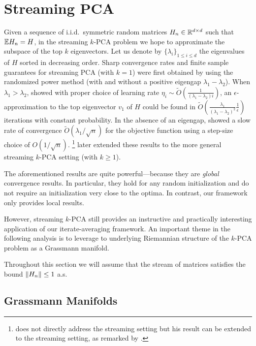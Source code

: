 \section{Streaming PCA} \label{sec:stream_pca_app}
Given a sequence of i.i.d.~symmetric random matrices $H_n \in \mathbb{R}^{d \times d}$ such that $\mathbb{E} H_n = H$, in the streaming $k$-PCA problem we hope to approximate the subspace of the top $k$ eigenvectors. Let us denote by $\{\lambda_i\}_{1\leq i\leq d}$ the eigenvalues of $H$ sorted in decreasing order. Sharp convergence rates and finite sample guarantees for streaming PCA (with $k=1$) were first obtained by \citet{jain2016streaming,shamir16b} using the randomized power method (with and without a positive eigengap $\lambda_1-\lambda_2$). When $\lambda_1>\lambda_2$,  \citet{jain2016streaming} showed
with proper choice of learning rate $\eta_i \sim  {\tilde{O}} \left( \frac{1}{(\lambda_1-\lambda_2)i} \right)$,  an $\epsilon$-approximation to the top eigenvector $v_1$ of $H$ could be found in $ {\tilde{O}}(\frac{\lambda_1}{(\lambda_1-\lambda_2)^2} \frac{1}{\epsilon})$ iterations with constant probability. In the absence of an eigengap, \citet{shamir16b} showed a slow rate of convergence $ {\tilde{O}}(\lambda_1/\sqrt{n})$ for the objective function using a step-size choice of $O(1/\sqrt{n})$. \citet{AllenLi2017-streampca,shamir2016fast}\footnote{\citet{shamir2016fast} does not directly address the streaming setting but his result can be extended to the streaming setting, as remarked by \citet{AllenLi2017-streampca}.} later extended these results to the more general streaming $k$-PCA setting (with $k\geq1$).

The aforementioned results are quite powerful---because they are \textit{global} convergence results. In particular, they hold for any random initialization and do not require an initialization very close to the optima. In contrast, our framework only provides local results.

However, streaming $k$-PCA still provides an instructive and practically interesting application of our iterate-averaging framework. An important theme in the following analysis is to leverage to underlying Riemannian structure of the $k$-PCA problem as a Grassmann manifold.

Throughout this section we will assume that the stream of matrices satisfies the bound $\norm{H_n} \leq 1$ a.s.

\subsection{Grassmann Manifolds}

